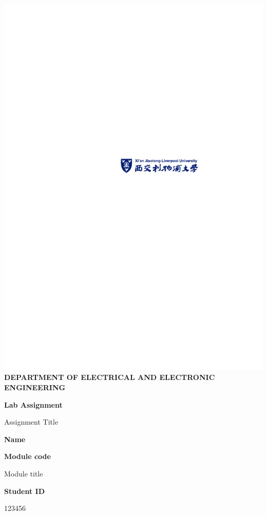 \documentclass[12pt,a4paper]{article}
\begin{document}
	\begin{titlepage}
		\begin{center}
			\includegraphics[scale=1.5]{Figures/CoverSheet}\\
			\bf{ \small{DEPARTMENT OF ELECTRICAL AND ELECTRONIC ENGINEERING} }
		\end{center}
		
		\vspace{4cm}
		\centering
		\textbf{\Huge Lab Assignment}
		
		\vspace{1cm}
		
		{\Large Assignment Title}
		
		\vspace{4cm}
		
		\textbf{\LARGE Name}
		
		\vspace{2cm}
		
		\textbf{\large Module code}
		
		\vspace{0.5cm}
		
		{\large Module title}
		
		\vspace{1.5cm}
		
		\textbf{\large Student ID}
		
		\vspace{0.5cm}
		
		{\large 123456}
		
		\vfill
		
	\end{titlepage}
\end{document}
